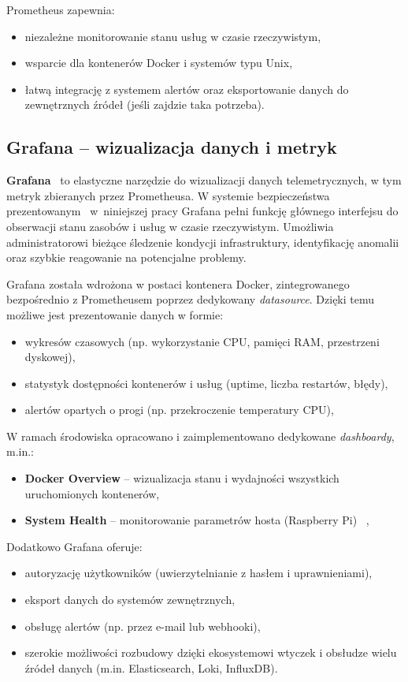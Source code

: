 \documentclass[
    left=2.5cm,         %
    right=2.5cm,        %
    top=2.5cm,          %
    bottom=3cm,         %
    bindingoffset=6mm,  %
    nohyphenation=true %
]{eiti/eiti-thesis} %
\begin{document}
Prometheus zapewnia:
\begin{itemize}
    \item niezależne monitorowanie stanu usług w czasie rzeczywistym,
    \item wsparcie dla kontenerów Docker i systemów typu Unix,
    \item łatwą integrację z systemem alertów oraz eksportowanie danych do zewnętrznych źródeł (jeśli zajdzie taka potrzeba).
\end{itemize}

\subsection{Grafana – wizualizacja danych i metryk}

\textbf{Grafana}~\cite{grafana-docs} to elastyczne narzędzie do wizualizacji danych telemetrycznych, w tym metryk zbieranych przez Prometheusa. W systemie bezpieczeństwa prezentowanym ~w~niniejszej pracy Grafana pełni funkcję głównego interfejsu do obserwacji stanu zasobów i usług w czasie rzeczywistym. Umożliwia administratorowi bieżące śledzenie kondycji infrastruktury, identyfikację anomalii oraz szybkie reagowanie na potencjalne problemy.

Grafana została wdrożona w postaci kontenera Docker, zintegrowanego bezpośrednio z Prometheusem poprzez dedykowany \textit{datasource}. Dzięki temu możliwe jest prezentowanie danych w formie:
\begin{itemize}
    \item wykresów czasowych (np. wykorzystanie CPU, pamięci RAM, przestrzeni dyskowej),
    \item statystyk dostępności kontenerów i usług (uptime, liczba restartów, błędy),
    \item alertów opartych o progi (np. przekroczenie temperatury CPU),
\end{itemize}

W ramach środowiska opracowano i zaimplementowano dedykowane \textit{dashboardy}, m.in.:
\begin{itemize}
    \item \textbf{Docker Overview} – wizualizacja stanu i wydajności wszystkich uruchomionych kontenerów,
    \item \textbf{System Health} – monitorowanie parametrów hosta (Raspberry Pi)~\cite{grafana-raspberry-dashboard} ,
\end{itemize}

Dodatkowo Grafana oferuje:
\begin{itemize}
    \item autoryzację użytkowników (uwierzytelnianie z hasłem i uprawnieniami),
    \item eksport danych do systemów zewnętrznych,
    \item obsługę alertów (np. przez e-mail lub webhooki),
    \item szerokie możliwości rozbudowy dzięki ekosystemowi wtyczek i obsłudze wielu źródeł danych (m.in. Elasticsearch, Loki, InfluxDB).
\end{itemize}
\end{document}
